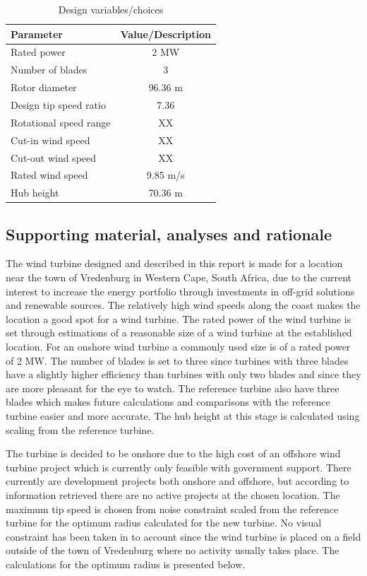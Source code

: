 \begin{table}[H]
\begin{center} 
\caption{Design variables/choices}\label{tab:systdesign2}
\begin{tabular}{ |l|c| } 
\hline
\textbf{Parameter} & \textbf{Value/Description}  \\ 
\hline
Rated power & 2 MW  \\ 
\hline
Number of blades & 3 \\ 
\hline
Rotor diameter & 96.36 m \\
\hline
Design tip speed ratio & 7.36 \\
\hline
Rotational speed range & XX \\
\hline
Cut-in wind speed & XX \\
\hline
Cut-out wind speed & XX \\
\hline
Rated wind speed & 9.85 m/s\\
\hline
Hub height & 70.36 m\\
\hline
\end{tabular}
\end{center}
\end{table}

\subsection{Supporting material, analyses and rationale}

The wind turbine designed and described in this report is made for a location near the town of Vredenburg in Western Cape, South Africa, due to the current interest to increase the energy portfolio through investments in off-grid solutions and renewable sources. The relatively high wind speeds along the coast makes the location a good spot for a wind turbine. The rated power of the wind turbine is set through estimations of a reasonable size of a wind turbine at the established location. For an onshore wind turbine a commonly used size is of a rated power of 2 MW. The number of blades is set to three since turbines with three blades have a slightly higher efficiency than turbines with only two blades and since they are more pleasant for the eye to watch. The reference turbine also have three blades which makes future calculations and comparisons with the reference turbine easier and more accurate. The hub height at this stage is calculated using scaling from the reference turbine.

The turbine is decided to be onshore due to the high cost of an offshore wind turbine project which is currently only feasible with government support. There currently are development projects both onshore and offshore, but according to information retrieved there are no active projects at the chosen location. The maximum tip speed is chosen from noise constraint scaled from the reference turbine for the optimum radius calculated for the new turbine. No visual constraint has been taken in to account since the wind turbine is placed on a field outside of the town of Vredenburg where no activity usually takes place. The calculations for the optimum radius is presented below.

